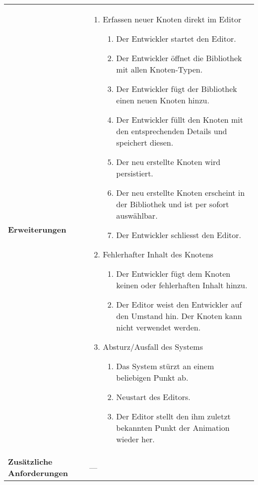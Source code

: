 \begin{longtabu}{p{0.5\textwidth}p{0.5\textwidth}}
    \cmidrule(r){1-1}\cmidrule(lr){2-2}
        \textbf{Erweiterungen} &
        \begin{enumerate}[label= (\alph*)]
            \item{Erfassen neuer Knoten direkt im Editor
                \begin{enumerate}[label= (\roman*)]
                    \item{Der Entwickler startet den Editor.}
                    \item{Der Entwickler öffnet die Bibliothek mit allen
                            Knoten-Typen.}
                    \item{Der Entwickler fügt der Bibliothek einen neuen
                            Knoten hinzu.}
                    \item{Der Entwickler füllt den Knoten mit den
                            entsprechenden Details und speichert diesen.}
                    \item{Der neu erstellte Knoten wird persistiert.}
                    \item{Der neu erstellte Knoten erscheint in der
                            Bibliothek und ist per sofort auswählbar.}
                    \item{Der Entwickler schliesst den Editor.}
                \end{enumerate}
            }
            \item{Fehlerhafter Inhalt des Knotens
                \begin{enumerate}[label= (\roman*)]
                    \item{Der Entwickler fügt dem Knoten keinen oder
                            fehlerhaften Inhalt hinzu.}
                    \item{Der Editor weist den Entwickler auf den Umstand
                            hin. Der Knoten kann nicht verwendet werden.}
                \end{enumerate}
            }
            \item{Absturz/Ausfall des Systems
                \begin{enumerate}[label= (\roman*)]
                        \item{Das System stürzt an einem beliebigen Punkt
                                ab.}
                        \item{Neustart des Editors.}
                        \item{Der Editor stellt den ihm zuletzt bekannten
                                Punkt der Animation wieder her.}
                \end{enumerate}
            }
        \end{enumerate}
        \\
    \cmidrule(r){1-1}\cmidrule(lr){2-2}
        \textbf{Zusätzliche Anforderungen} &
        ---\\
    \bottomrule
\end{longtabu}

